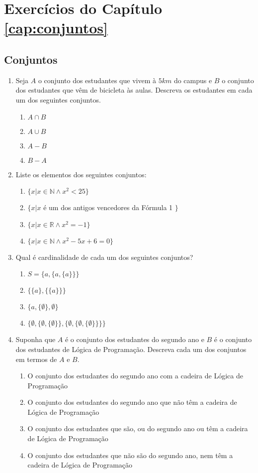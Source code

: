 \chapter*{Exercícios do Capítulo \ref{cap:conjuntos}}

\section*{Conjuntos}

\begin{enumerate}
  	\item Seja $A$ o conjunto dos estudantes que vivem à $5 km$ do campus e $B$ o conjunto dos estudantes que vêm 
  	de bicicleta às aulas. Descreva os estudantes em cada um dos seguintes conjuntos.
  	\begin{enumerate}
  	  	\item $A \cap B$ \item $A \cup B$ \item $A - B$ \item $B - A$
  	\end{enumerate}
  	
  	\item Liste os elementos dos seguintes conjuntos:
  	\begin{enumerate}
  		 \item $\{x | x \in \mathbb{N} \land x^2 < 25\}$ \item $\{x | x$ é um dos antigos vencedores da Fórmula 1 $\}$
  		 \item $\{x | x \in \mathbb{R} \land x^2 = -1\}$ \item $\{x | x \in \mathbb{N} \land x^2 - 5x + 6 = 0\}$
	\end{enumerate}
	
	\item Qual é cardinalidade de cada um dos seguintes conjuntos?
	\begin{enumerate}
	  	\item $ S = \{a, \{a, \{a\}\}\}$ \item $\{\{a\}, \{\{a\}\}\}$ \item $\{a, \{\emptyset \}, \emptyset\}$
	  	\item $\{\emptyset, \{\emptyset, \{\emptyset\}\},\{\emptyset, \{\emptyset, \{\emptyset\}\}\}\}$
	\end{enumerate}
	
  	\item Suponha que $A$ é o conjunto dos estudantes do segundo ano e $B$ é o conjunto dos estudantes de Lógica de Programação.
  	Descreva cada um dos conjuntos em termos de $A$ e $B$.
  	\begin{enumerate}
  		\item O conjunto dos estudantes do segundo ano com a cadeira de Lógica de Programação
  		\item O conjunto dos estudantes do segundo ano que não têm a cadeira de Lógica de Programação
  		\item O conjunto dos estudantes que são, ou do segundo ano ou têm a cadeira de Lógica de Programação
  		\item O conjunto dos estudantes que não são do segundo ano, nem têm a cadeira de Lógica de Programação
	\end{enumerate}


\end{enumerate}
